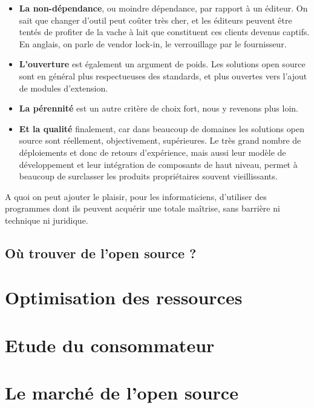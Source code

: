 \begin{itemize}[label=\textbullet, font=\LARGE \color{burntorange}]
	\item \textbf{La non-dépendance}, ou moindre dépendance, par rapport à un éditeur. On sait que changer d'outil peut coûter très cher, et les éditeurs peuvent être tentés de profiter de la vache à lait que constituent ces clients devenus captifs. En anglais, on parle de vendor lock-in, le verrouillage par le fournisseur.
	\item \textbf{L'ouverture} est également un argument de poids. Les solutions open source sont en général plus respectueuses des standards, et plus ouvertes vers l'ajout de modules d'extension.
	\item \textbf{La pérennité} est un autre critère de choix fort, nous y revenons plus loin.
	\item \textbf{Et la qualité} finalement, car dans beaucoup de domaines les solutions open source sont réellement, objectivement, supérieures. Le très grand nombre de déploiements et donc de retours d'expérience, mais aussi leur modèle de développement et leur intégration de composants de haut niveau, permet à beaucoup de surclasser les produits propriétaires souvent vieillissants.
\end{itemize}

	A quoi on peut ajouter le plaisir, pour les informaticiens, d'utiliser des programmes dont ils peuvent acquérir une totale maîtrise, sans barrière ni technique ni juridique.

		\subsection{Où trouver de l'open source ?}
	
	\section{Optimisation des ressources}
	
	\section{Etude du consommateur}

	\section{Le marché de l'open source}


